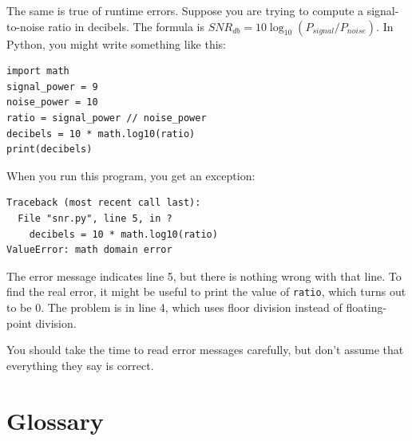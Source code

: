 \documentclass[10pt]{book}
\begin{document}
The same is true of runtime errors.  Suppose you are trying
to compute a signal-to-noise ratio in decibels.  The formula
is $SNR_{db} = 10 \log_{10} (P_{signal} / P_{noise})$.  In Python,
you might write something like this:

\begin{verbatim}
import math
signal_power = 9
noise_power = 10
ratio = signal_power // noise_power
decibels = 10 * math.log10(ratio)
print(decibels)
\end{verbatim}
%
When you run this program, you get an exception:
%

\begin{verbatim}
Traceback (most recent call last):
  File "snr.py", line 5, in ?
    decibels = 10 * math.log10(ratio)
ValueError: math domain error
\end{verbatim}
%
The error message indicates line 5, but there is nothing
wrong with that line.  To find the real error, it might be
useful to print the value of {\tt ratio}, which turns out to
be 0.  The problem is in line 4, which uses floor division
instead of floating-point division.

You should take the time to read error messages carefully, but don't
assume that everything they say is correct.


\section{Glossary}
\end{document}
